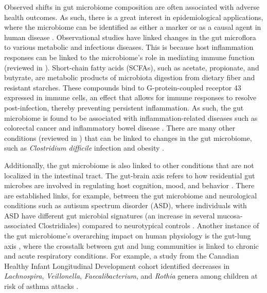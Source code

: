 Observed shifts in gut microbiome composition are often associated with adverse health outcomes. As such, there is a great interest in epidemiological applications, where the microbiome can be identified as either a marker or as a causal agent in human disease \cite{foxman2015use}. Observational studies have linked changes in the gut microflora to various metabolic and infectious diseases. This is because host inflammation responses can be linked to the microbiome's role in mediating immune function (reviewed in \cite{wang2020relationship}). Short-chain fatty acids (SCFAs), such as acetate, propionate, and butyrate, are metabolic products of microbiota digestion from dietary fiber and resistant starches. These compounds bind to G-protein-coupled receptor 43 expressed in immune cells, an effect that allows for immune responses to resolve post-infection, thereby preventing persistent inflammation. As such, the gut microbiome is found to be associated with inflammation-related diseases such as colorectal cancer \cite{cheng2020intestinal, yu2017metagenomica} and inflammatory bowel disease \cite{gevers2014treatmentnaive, franzosa2019gut, lloyd-price2019multiomics}. There are many other conditions (reviewed in \cite{cho2012human}) that can be linked to changes in the gut microbiome, such as \emph{Clostridium difficile} infection \cite{weingarden2014microbiota} and obesity \cite{turnbaugh2009core, aoun2020influence}.   

Additionally, the gut microbiome is also linked to other conditions that are not localized in the intestinal tract. The gut-brain axis refers to how residential gut microbes are involved in regulating host cognition, mood, and behavior \cite{morais2021gut}. There are established links, for example, between the gut microbiome and neurological conditions such as autisum spectrum disorder (ASD), where individuals with ASD have different gut microbial signatures (an increase in several mucosa-associated Clostridiales) compared to neurotypical controls \cite{luna2017distinct}. Another instance of the gut microbiome's overarching impact on human physiology is the gut-lung axis \cite{enaud2020gutlung}, where the crosstalk between gut and lung communities is linked to chronic and acute respiratory conditions. For example, a study from the Canadian Healthy Infant Longitudinal Development cohort identified decreases in \emph{Lachnospira}, \emph{Veillonella}, \emph{Faecalibacterium}, and \emph{Rothia} genera among children at risk of asthma attacks \cite{arrieta2015early}. 


